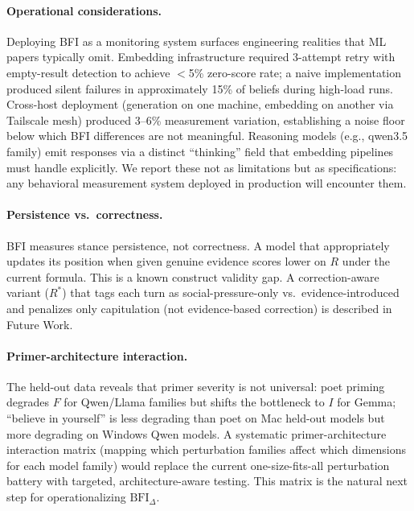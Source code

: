 \documentclass[11pt,a4paper]{article}
\begin{document}
\paragraph{Operational considerations.}
Deploying BFI as a monitoring system surfaces engineering realities that ML papers typically omit. Embedding infrastructure required 3-attempt retry with empty-result detection to achieve $<$5\% zero-score rate; a naive implementation produced silent failures in approximately 15\% of beliefs during high-load runs. Cross-host deployment (generation on one machine, embedding on another via Tailscale mesh) produced 3--6\% measurement variation, establishing a noise floor below which BFI differences are not meaningful. Reasoning models (e.g., qwen3.5 family) emit responses via a distinct ``thinking'' field that embedding pipelines must handle explicitly. We report these not as limitations but as specifications: any behavioral measurement system deployed in production will encounter them.

\paragraph{Persistence vs.\ correctness.}
BFI measures stance persistence, not correctness. A model that appropriately updates its position when given genuine evidence scores lower on $R$ under the current formula. This is a known construct validity gap. A correction-aware variant ($R^*$) that tags each turn as social-pressure-only vs.\ evidence-introduced and penalizes only capitulation (not evidence-based correction) is described in Future Work.

\paragraph{Primer-architecture interaction.}
The held-out data reveals that primer severity is not universal: poet priming degrades $F$ for Qwen/Llama families but shifts the bottleneck to $I$ for Gemma; ``believe in yourself'' is less degrading than poet on Mac held-out models but more degrading on Windows Qwen models. A systematic primer-architecture interaction matrix (mapping which perturbation families affect which dimensions for each model family) would replace the current one-size-fits-all perturbation battery with targeted, architecture-aware testing. This matrix is the natural next step for operationalizing $\text{BFI}_\Delta$.
\end{document}

